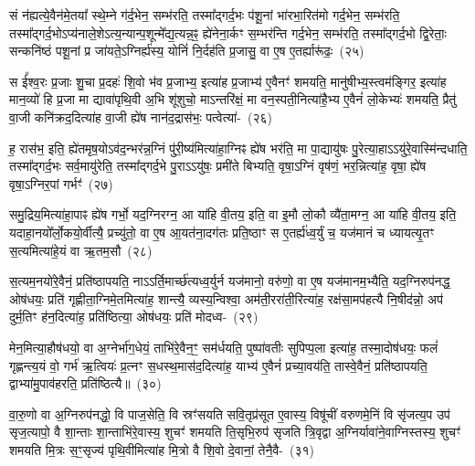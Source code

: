 सं न॑ह्यत्ये॒वैन॑मे॒तया᳚ स्थे॒म्ने ग॑र्द॒भेन॒ सम्भ॑रति॒ तस्मा᳚द्\-गर्द॒भः प॑शू॒नां भा॑रभा॒रित॑मो गर्द॒भेन॒ सम्भ॑रति॒ तस्मा᳚द्\-गर्द॒भो\-ऽप्य॑नाले॒शे\-ऽ\-त्य॒न्यान्प॒शून्मे᳚द्य॒त्यन्न॒ꣴ॒ ह्ये॑नेना॒र्कꣳ स॒म्भर॑न्ति गर्द॒भेन॒ सम्भ॑रति॒ तस्मा᳚द्\-गर्द॒भो द्वि॒रेताः॒ सन्कनि॑ष्ठं पशू॒नां प्र जा॑यते॒\-ऽग्निर्ह्य॑स्य॒ योनिं॑ नि॒र्दह॑ति प्र॒जासु॒ वा ए॒ष ए॒तर्\mbox{}ह्यारू॑ढः॒~(२५)\ip

स ई᳚श्व॒रः प्र॒जाः शु॒चा प्र॒दहः॑ शि॒वो भ॑व प्र॒जाभ्य॒ इत्या॑ह प्र॒जाभ्य॑ ए॒वैनꣳ॑ शमयति॒ मानु॑षीभ्य॒स्त्वम॑ङ्गिर॒ इत्या॑ह मान॒व्यो॑ हि प्र॒जा मा द्यावा॑\-पृथि॒वी अ॒भि शू॑शुचो॒ माऽन्तरि॑क्षं॒ मा वन॒स्पती॒नित्या॑है॒भ्य ए॒वैनं॑ लो॒केभ्यः॑ शमयति॒ प्रैतु॑ वा॒जी कनि॑क्रद॒दित्या॑ह वा॒जी ह्ये॑ष नान॑द॒द्रास॑भः॒ पत्वेत्या॑-~(२६)\ip

ह॒ रास॑भ॒ इति॒ ह्ये॑तमृष॒यो\-ऽव॑द॒न्भर॑न्न॒ग्निं पु॑री॒ष्य॑मित्या॑हा॒ग्निꣴ ह्ये॑ष भर॑ति॒ मा पा॒द्यायु॑षः पु॒रेत्या॒हा\-ऽऽ\-यु॑रे॒वास्मि॑न्दधाति॒ तस्मा᳚द्\-गर्द॒भः सर्व॒मायु॑रेति॒ तस्मा᳚द्\-गर्द॒भे पु॒रा\-ऽऽ\-यु॑षः॒ प्रमी॑ते बिभ्यति॒ वृषा॒\-ऽ\-ग्निं वृष॑णं॒ भर॒न्नित्या॑ह॒ वृषा॒ ह्ये॑ष वृषा॒\-ऽ\-ग्निर॒पां गर्भꣳ॑~(२७)\ip

समु॒द्रिय॒मित्या॑हा॒पाꣴ ह्ये॑ष गर्भो॒ यद॒ग्निरग्न॒ आ या॑हि वी॒तय॒ इति॒ वा इ॒मौ लो॒कौ व्यै॑ता॒मग्न॒ आ या॑हि वी॒तय॒ इति॒ यदाहा॒नयो᳚र्लो॒कयो॒र्वीत्यै॒ प्रच्यु॑तो॒ वा ए॒ष आ॒यत॑ना॒दग॑तः प्रति॒ष्ठाꣳ स ए॒तर्\mbox{}ह्य॑ध्व॒र्युं च॒ यज॑मानं च ध्यायत्यृ॒तꣳ स॒त्यमित्या॑हे॒यं वा ऋ॒तम॒सौ~(२८)\ip

स॒त्यम॒नयो॑रे॒वैनं॒ प्रति॑\-ष्ठापयति॒ नाऽऽर्ति॒मार्च्छ॑त्यध्व॒र्युर्न यज॑मानो॒ वरु॑णो॒ वा ए॒ष यज॑मानम॒भ्यैति॒ यद॒ग्निरुप॑नद्ध॒ ओष॑धयः॒ प्रति॑ गृह्णीता॒ग्निमे॒तमित्या॑ह॒ शान्त्यै॒ व्यस्य॒न्विश्वा॒ अम॑ती॒ररा॑ती॒रित्या॑ह॒ रक्ष॑सा॒मप॑हत्यै नि॒षीद॑न्नो॒ अप॑ दुर्म॒तिꣳ ह॑न॒दित्या॑ह॒ प्रति॑ष्ठित्या॒ ओष॑धयः॒ प्रति॑ मोदध्व-~(२९)\ip

मेन॒मित्या॒हौष॑धयो॒ वा अ॒ग्नेर्भा॑ग॒धेयं॒ ताभि॑रे॒वैन॒ꣳ॒ सम॑र्धयति॒ पुष्पा॑वतीः सुपिप्प॒ला इत्या॑ह॒ तस्मा॒दोष॑धयः॒ फलं॑ गृह्णन्त्य॒यं वो॒ गर्भ॑ ऋ॒त्वियः॑ प्र॒त्नꣳ स॒धस्थ॒मास॑द॒दित्या॑ह॒ याभ्य॑ ए॒वैनं॑ प्रच्या॒वय॑ति॒ तास्वे॒वैनं॒ प्रति॑\-ष्ठापयति॒ द्वाभ्या॑मु॒पाव॑हरति॒ प्रति॑ष्ठित्यै॥~(३०)\ip

{\anuvakamend[{अ॒स्त्व॒नु॒ष्टुब॑सि सादय॒त्यारू॑ढः॒ पत्वेति॒ गर्भ॑म॒सौ मो॑दध्वं॒ द्विच॑त्वारिꣳशच्च}]}

वा॒रु॒णो वा अ॒ग्निरुप॑नद्धो॒ वि पाज॒सेति॒ वि स्रꣳ॑सयति सवि॒तृप्र॑सूत ए॒वास्य॒ विषू॑चीं वरुणमे॒निं वि सृ॑जत्य॒प उप॑ सृज॒त्यापो॒ वै शा॒न्ताः शा॒न्ताभि॑रे॒वास्य॒ शुचꣳ॑ शमयति ति॒सृभि॒रुप॑ सृजति त्रि॒वृद्वा अ॒ग्निर्यावा॑ने॒वाग्निस्तस्य॒ शुचꣳ॑ शमयति मि॒त्रः स॒ꣳ॒सृज्य॑ पृथि॒वीमित्या॑ह मि॒त्रो वै शि॒वो दे॒वानां॒ तेनै॒वै-~(३१)\ip

